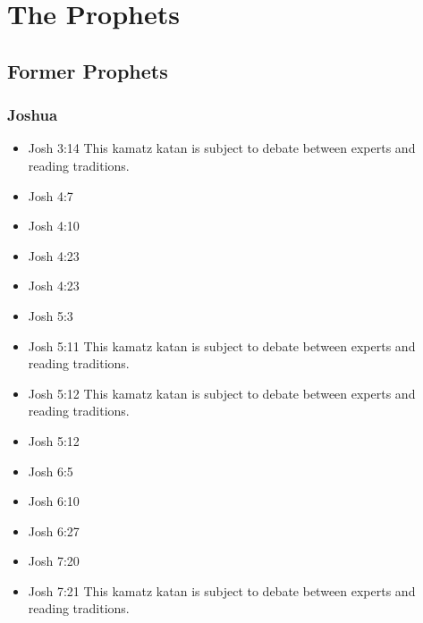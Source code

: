 \documentclass[14pt]{book}
\begin{document}
\chapter{The Prophets}

\section{Former Prophets}

\subsection{Joshua}

\begin{multicols}{2}
\begin{itemize} \item Josh 3:14 This kamatz katan is subject to debate between experts and reading traditions.
	
	\item Josh 4:7
	
	\item Josh 4:10
	
	\item Josh 4:23
	
	\item Josh 4:23
	
	\item Josh 5:3
	
	\item Josh 5:11 This kamatz katan is subject to debate between experts and reading traditions.
	
	\item Josh 5:12 This kamatz katan is subject to debate between experts and reading traditions.
	
	\item Josh 5:12
	
	\item Josh 6:5
	
	\item Josh 6:10
	
	\item Josh 6:27
	
	\item Josh 7:20
	
	\item Josh 7:21 This kamatz katan is subject to debate between experts and reading traditions.
	

\end{itemize}
\end{multicols}
\end{document}
